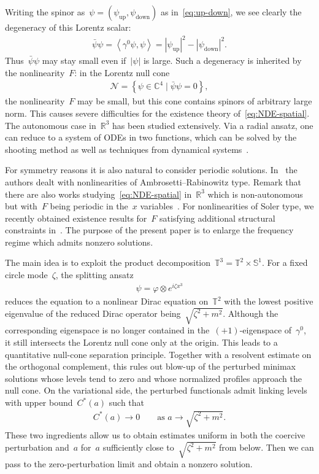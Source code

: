 \documentclass[11pt,final]{amsart}
\newcommand{\R}{\mathbb{R}}
\newcommand{\C}{\mathbb{C}}
\newcommand{\T}{\mathbb{T}}
\newcommand{\sph}{\mathbb{S}}
\newcommand{\Abracket}[1]{\left<#1\right>} %
\newcommand{\braces}[1]{\left\{#1\right\}} %
\DeclareMathOperator{\up}{up}
\DeclareMathOperator{\down}{down}
\begin{document}
Writing the spinor as~$\psi=(\psi_{\up},\psi_{\down})$ as in~\eqref{eq:up-down}, we see clearly the degeneracy of this Lorentz scalar:
\begin{align}
    \bar{\psi}\psi=\Abracket{\gamma^0\psi,\psi}
    =|\psi_{\up}|^2 - |\psi_{\down}|^2.
\end{align}
Thus~$\bar{\psi}\psi$ may stay small even if~$|\psi|$ is large. 
Such a degeneracy is inherited by the nonlinearity~$F$: 
in the Lorentz null cone
\begin{align}
    \mathcal{N}=\braces{\psi\in\C^4 \mid \bar{\psi}\psi=0}, 
\end{align}
the nonlinearity~$F$ may be small, but this cone contains spinors of arbitrary large norm. 
This causes severe difficulties for the existence theory of~\eqref{eq:NDE-spatial}.
The autonomous case in~$\R^3$ has been studied extensively.
Via a radial ansatz, one can reduce to a system of ODEs in two functions, which can be solved by the shooting method as well as techniques from dynamical systems~\cite{BalabaneCazenave1988Existence,Cazenave1986Existence, EstebanSere1995stationary,Merle1988Existence}.


For symmetry reasons it is also natural to consider periodic solutions. 
In~\cite{DingLiu2014periodic} the authors dealt with nonlinearities of Ambrosetti--Rabinowitz type. 
Remark that there are also works studying~\eqref{eq:NDE-spatial} in~$\R^3$ which is non-autonomous but with~$F$ being periodic in the~$x$ variables~\cite{BartschDing2006Solutions,DingLiu2015Periodic,DingLiu2017Periodic}. 
For nonlinearities of Soler type, we recently obtained existence results for~$F$ satisfying additional structural constraints in~\cite{WZ2026Stationary}. 
The purpose of the present paper is to enlarge the frequency regime which admits nonzero solutions.

The main idea is to exploit the product decomposition~$\T^3=\T^2\times\sph^1$.
For a fixed circle mode~$\zeta$, the splitting ansatz
\begin{align}
    \psi=\varphi\otimes e^{i\zeta x^3}
\end{align}
reduces the equation to a nonlinear Dirac equation on~$\T^2$ with the lowest positive eigenvalue of the reduced Dirac operator being~$\sqrt{\zeta^2+m^2}$.
Although the corresponding eigenspace is no longer contained in the~$(+1)$-eigenspace of~$\gamma^0$, it still intersects the Lorentz null cone only at the origin. 
This leads to a quantitative null-cone separation principle. 
Together with a resolvent estimate on the orthogonal complement, this rules out blow-up of the perturbed minimax solutions whose levels tend to zero and whose normalized profiles approach the null cone. 
On the variational side, the perturbed functionals admit linking levels with upper bound~$C^*(a)$ such that 
\begin{align}
    C^*(a)\to 0 \qquad\mbox{as }a\to \sqrt{\zeta^2+m^2}. 
\end{align}
These two ingredients allow us to obtain estimates uniform in both the
coercive perturbation and~$a$ for~$a$ sufficiently close to~$\sqrt{\zeta^2+m^2}$
from below. 
Then we can pass to the zero-perturbation limit and obtain a nonzero solution. 
\end{document}
